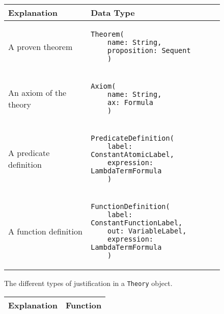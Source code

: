   {
    \def\arraystretch{4}

    \begin{figure}[hp]
      \begin{center}
        \begin{tabular}{l|l}
          Explanation            & Data Type
          \\ \hline

          A proven theorem       &
          \begin{lstlisting}[linewidth=19.5em]
  Theorem(
    name: String,
    proposition: Sequent
    )

          \end{lstlisting}
          \\ %

          An axiom of the theory &
          \begin{lstlisting}[linewidth=19.5em]
  Axiom(
    name: String,
    ax: Formula
    )

          \end{lstlisting}
          \\ %

          A predicate definition &
          \begin{lstlisting}[linewidth=19.5em]
  PredicateDefinition(
    label: ConstantAtomicLabel,
    expression: LambdaTermFormula
    )

          \end{lstlisting}
          \\ %

          A function definition  &
          \begin{lstlisting}[linewidth=19.5em]
  FunctionDefinition(
    label: ConstantFunctionLabel,
    out: VariableLabel,
    expression: LambdaTermFormula
    )

          \end{lstlisting}
          \\ %
        \end{tabular}

        \caption{The different types of justification in a \lstinline|Theory|{} object.}
        \label{fig:justifications}
      \end{center}
    \end{figure}

    \begin{figure}[hp]
      \begin{center}
        \begin{tabular}{l|l}
          Explanation & Function
          \\ \hline


\end{tabular}
\end{center}
\end{figure}}
